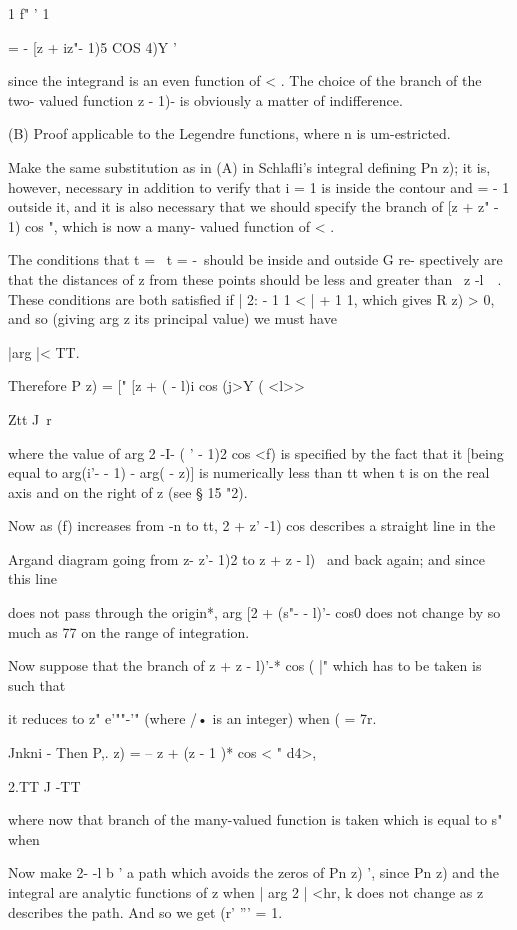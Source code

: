 {{1 f" ' 1

= - [z + iz"- 1)5 COS 4)Y '

since the integrand is an even function of < . The choice of the
branch of the two- valued function z - 1)- is obviously a matter of
indifference.

(B) Proof applicable to the Legendre functions, where n is
um-estricted.

Make the same substitution as in (A) in Schlafli's integral defining
Pn z); it is, however, necessary in addition to verify that i = 1 is
inside the contour and = - 1 outside it, and it is also necessary that
we should specify the branch of [z + z" - 1) cos ", which is now a
many- valued function of < .

The conditions that t = \, t = -\ should be inside and outside G re-
spectively are that the distances of z from these points should be
less and greater than \ z -l\ \ . These conditions are both satisfied
if | 2: - 1 1 < | + 1 1, which gives R z) > 0, and so (giving arg z
its principal value) we must have

|arg |< TT.

Therefore P z) = [" [z + ( - l)i cos (j>Y ( <l>>

Ztt J \,r

where the value of arg 2 -I- ( ' - 1)2 cos <f) is specified by the
fact that it [being equal to arg(i'- - 1) - arg( - z)] is numerically
less than tt when t is on the real axis and on the right of z (see §
15 "2).

Now as (f) increases from -n to tt, 2 + z' -1) cos describes a
straight line in the

Argand diagram going from z- z'- 1)2 to z + z - l)~ and back again;
and since this line

does not pass through the origin*, arg [2 + (s"- - l)'- cos0 does not
change by so much as 77 on the range of integration.

Now suppose that the branch of z + z - l)'-* cos ( |" which has to be
taken is such that

it reduces to z" e'""-'" (where /• is an integer) when ( = 7r.

Jnkni - Then P,. z) = -- z + (z - 1 )* cos < " d4>,

2.TT J -TT

where now that branch of the many-valued function is taken which is
equal to s" when

Now make 2- -l b ' a path which avoids the zeros of Pn z) ', since Pn
z) and the integral are analytic functions of z when | arg 2 | <hr, k
does not change as z describes the path. And so we get (r' ''' = 1.

}}
